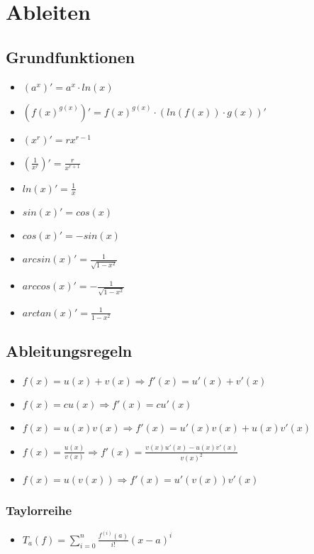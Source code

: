 \section{Ableiten}

\subsection{Grundfunktionen}
\begin{itemize}
    \item $(a^x)' = a^x \cdot ln(x)$
    \item $(f(x)^{g(x)})' = f(x)^{g(x)} \cdot (ln(f(x)) \cdot g(x))'$
	\item $(x^r)' = r x^{r-1}$
	\item $(\frac{1}{x^r})' = \frac{r}{x^{r+1}}$
	\item $ln(x)' = \frac{1}{x}$
	\item $sin(x)' = cos(x)$
	\item $cos(x)' = -sin(x)$
	\item $arcsin(x)' = \frac{1}{\sqrt{1-x^2}}$
	\item $arccos(x)' = - \frac{1}{\sqrt{1-x^2}}$
	\item $arctan(x)' = \frac{1}{1-x^2}$

\end{itemize}

\subsection{Ableitungsregeln}
\begin{itemize}
	\item $f(x) = u(x) + v(x) \Rightarrow f'(x) = u'(x) + v'(x)$
	\item $f(x) = c u(x) \Rightarrow f'(x) = c u'(x)$
	\item $f(x) = u(x) v(x) \Rightarrow f'(x) = u'(x) v(x) + u(x) v'(x)$
	\item $f(x) = \frac{u(x)}{v(x)} \Rightarrow f'(x) = \frac{v(x) u'(x) - u(x) v'(x)}{v(x)^2}$
	\item $f(x) = u(v(x)) \Rightarrow f'(x) = u'(v(x)) v'(x)$
\end{itemize}
\subsubsection{Taylorreihe}
\begin{itemize}
	\item $T_a(f) = \sum_{i=0}^n \frac{f^{(i)}(a)}{i!}(x-a)^i$
\end{itemize}

